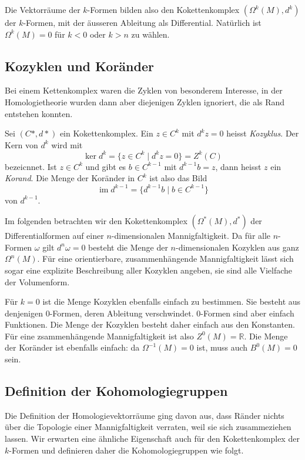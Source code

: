 Die Vektorräume der $k$-Formen bilden also den Kokettenkomplex
$(\Omega^k(M),d^k)$ der $k$-Formen,
mit der äusseren Ableitung als Differential.
Natürlich ist $\Omega^k(M)=0$ für $k<0$ oder $k>n$ zu wählen.

%
%
\subsection{Kozyklen und Koränder}
Bei einem Kettenkomplex waren die Zyklen von besonderem Interesse,
in der Homologietheorie wurden dann aber diejenigen Zyklen ignoriert,
die als Rand entstehen konnten.

\begin{definition}
Sei $(C*,d*)$ ein Kokettenkomplex.
Ein $z\in C^k$ mit $d^kz=0$ heisst \emph{Kozyklus}.
%
Der Kern von $d^k$ wird mit
\[
\ker d^k = \{ z\in C^k\mid d^kz=0\}
=
Z^k(C)
\]
bezeicnnet.
Ist $z\in C^k$ und gibt es $b\in C^{k-1}$ mit $d^{k-1}b=z$, dann 
heisst $z$ ein \emph{Korand}.
%
Die Menge der Koränder in $C^k$ ist also das Bild
\[
\operatorname{im}d^{k-1}
=
\{
d^{k-1}b\mid b\in C^{k-1}
\}
\]
von $d^{k-1}$.
\end{definition}

Im folgenden betrachten wir den Kokettenkomplex $(\Omega^*(M),d^*)$ 
der Differentialformen auf einer $n$-dimensionalen Mannigfaltigkeit.
Da für alle $n$-Formen $\omega$ gilt $d^n\omega=0$ besteht die Menge
der $n$-dimensionalen Kozyklen aus ganz $\Omega^n(M)$.
Für eine orientierbare, zusammenhängende Mannigfaltigkeit lässt sich
sogar eine explizite Beschreibung aller Kozyklen angeben, sie sind
alle Vielfache der Volumenform.

Für $k=0$ ist die Menge Kozyklen ebenfalls einfach zu bestimmen.
Sie besteht aus denjenigen $0$-Formen, deren Ableitung verschwindet.
0-Formen sind aber einfach Funktionen.
Die Menge der Kozyklen besteht daher einfach aus den Konstanten.
Für eine zsammenhängende Mannigfaltigkeit ist also
$Z^0(M)=\mathbb{R}$.
Die Menge der Koränder ist ebenfalls einfach: da $\Omega^{-1}(M)=0$ ist,
muss auch $B^0(M)=0$ sein.

%
%
\subsection{Definition der Kohomologiegruppen}
Die Definition der Homologievektorräume ging davon aus, dass Ränder
nichts über die Topologie einer Mannigfaltigkeit verraten, weil sie
sich zusammeziehen lassen.
Wir erwarten eine ähnliche Eigenschaft auch für den Kokettenkomplex
der $k$-Formen und definieren daher die Kohomologiegruppen wie 
folgt.

